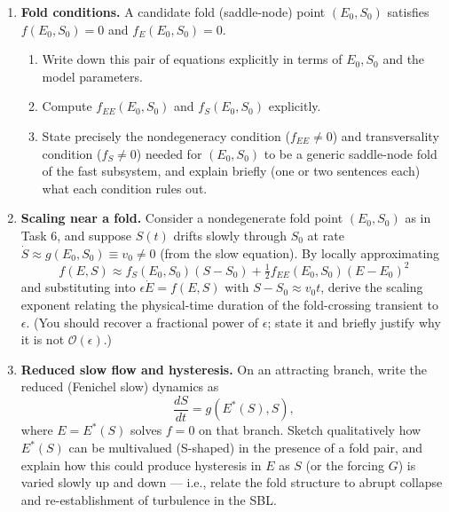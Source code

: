 \documentclass[11pt,fleqn]{article}
\begin{document}
\begin{enumerate}
    \item \textbf{Fold conditions.} A candidate fold (saddle-node) point $(E_0,S_0)$ satisfies $f(E_0,S_0)=0$ and $f_E(E_0,S_0)=0$.
    \begin{enumerate}[label=(\roman*)]
        \item Write down this pair of equations explicitly in terms of $E_0, S_0$ and the model parameters.
        \item Compute $f_{EE}(E_0,S_0)$ and $f_S(E_0,S_0)$ explicitly.
        \item State precisely the nondegeneracy condition ($f_{EE} \neq 0$) and transversality condition ($f_S \neq 0$) needed for $(E_0,S_0)$ to be a generic saddle-node fold of the fast subsystem, and explain briefly (one or two sentences each) what each condition rules out.
    \end{enumerate}

    \item \textbf{Scaling near a fold.} Consider a nondegenerate fold point $(E_0, S_0)$ as in Task 6, and suppose $S(t)$ drifts slowly through $S_0$ at rate $\dot S \approx g(E_0,S_0) \equiv v_0 \neq 0$ (from the slow equation). By locally approximating
    \[
    f(E,S) \approx f_S(E_0,S_0)(S - S_0) + \tfrac12 f_{EE}(E_0,S_0)(E-E_0)^2
    \]
    and substituting into $\epsilon \dot E = f(E,S)$ with $S - S_0 \approx v_0 t$, derive the scaling exponent relating the physical-time duration of the fold-crossing transient to $\epsilon$. (You should recover a fractional power of $\epsilon$; state it and briefly justify why it is not $\mathcal{O}(\epsilon)$.)

    \item \textbf{Reduced slow flow and hysteresis.} On an attracting branch, write the reduced (Fenichel slow) dynamics as
    \[
    \frac{dS}{dt} = g(E^*(S), S),
    \]
    where $E = E^*(S)$ solves $f=0$ on that branch. Sketch qualitatively how $E^*(S)$ can be multivalued (S-shaped) in the presence of a fold pair, and explain how this could produce hysteresis in $E$ as $S$ (or the forcing $G$) is varied slowly up and down — i.e., relate the fold structure to abrupt collapse and re-establishment of turbulence in the SBL.
\end{enumerate}

\end{document}
